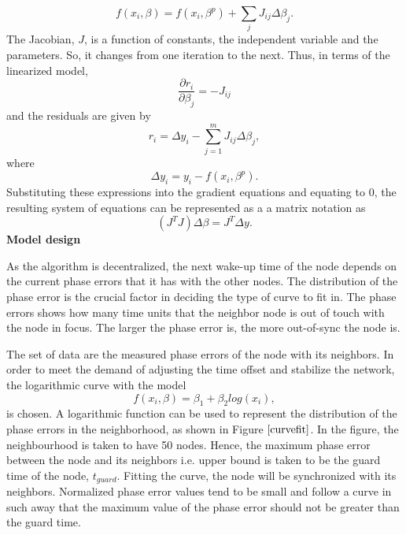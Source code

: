 \documentclass[journal]{IEEEtran}
\begin{document}
\begin{equation}
 f(x_i,\beta) =f(x_i, \beta^p)+\sum_j J_{ij} \Delta\beta_j.
\end{equation}
The Jacobian, $J$, is a function of constants, the independent
variable and the parameters. So, it changes from one iteration to the
next. Thus, in terms of the linearized model,
\begin{equation}
\dfrac{\partial r_i}{\partial \beta_j}=-J_{ij}
\end{equation}
and the residuals are given by
\begin{equation}
    r_i=\Delta y_i- \sum_{j=1}^{m} J_{ij}\Delta\beta_j,
\end{equation}
where
\begin{equation}
 \Delta y_i=y_i- f(x_i, \beta^p).
\end{equation}
Substituting these expressions into the gradient equations and
equating to $0$, the resulting system of equations can be represented as a a matrix notation as
\begin{equation}
    \left(J^TJ\right)\Delta  \beta=J^T\Delta y.
\end{equation}
\textbf{Model design} \par
As the algorithm is decentralized, the next wake-up time of the node depends on
the current phase errors that it has with the other nodes. The distribution of the phase error is the crucial factor in deciding the type of curve to fit in. The phase errors shows how many time units that the neighbor node is out of touch with the node in focus. The larger the phase error is, the more out-of-sync the node is.\par
The set of data are the measured phase errors of the node with its neighbors.
In order to meet the demand of adjusting the time offset and stabilize the network, the logarithmic curve with the model
\begin{equation}
 f(x_i,\beta)= \beta _1 + \beta_2log(x_i),
\end{equation}
is chosen. A logarithmic function can be used to represent the distribution of the phase errors in the neighborhood, as shown in Figure $\ref{curvefit}$. In the figure, the neighbourhood is taken to have 50 nodes. Hence, the maximum phase error between the node and its neighbors i.e. upper bound is taken to be the guard time of the node, $t_{guard}$. Fitting the curve, the node will be synchronized with its neighbors. Normalized phase error values tend to be small and follow a curve in such away that the maximum value of the phase error should not be greater than the guard time.
\end{document}
